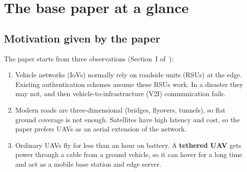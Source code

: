 \chapter{The base paper at a glance}\label{ch:p1paper}
\section{Motivation given by the paper}
The paper starts from three observations (Section~I of~\cite{tan2023}):
\begin{enumerate}[leftmargin=*]
\item Vehicle networks (IoVs) normally rely on roadside units (RSUs) at the edge. Existing authentication schemes assume these RSUs work. In a disaster
they may not, and then vehicle-to-infrastructure (V2I) communication fails.
\item Modern roads are three-dimensional (bridges, flyovers, tunnels), so flat ground coverage is not enough. Satellites have high latency and cost, so
the paper prefers UAVs as an aerial extension of the network.
\item Ordinary UAVs fly for less than an hour on battery. A \textbf{tethered UAV} gets power through a cable from a ground vehicle, so it can hover for a
long time and act as a mobile base station and edge server.
\end{enumerate}

